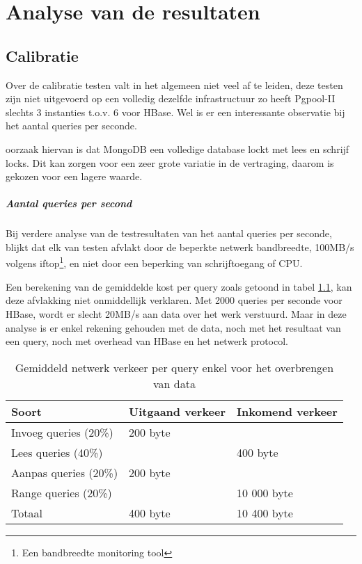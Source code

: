 \chapter{Analyse van de resultaten}

\section{Calibratie}
Over de calibratie testen valt in het algemeen niet veel af te leiden, deze testen zijn niet uitgevoerd op een volledig dezelfde infrastructuur zo heeft Pgpool-II slechts 3 instanties t.o.v. 6 voor HBase. Wel is er een interessante observatie bij het aantal queries per seconde.  

oorzaak hiervan is dat MongoDB een volledige database lockt met lees en schrijf locks. Dit kan zorgen voor een zeer grote variatie in de vertraging, daarom is gekozen voor een lagere waarde.  

\paragraph{Aantal queries per second} Bij verdere analyse van de testresultaten van het aantal queries per seconde, blijkt dat elk van testen afvlakt door de beperkte netwerk bandbreedte, 100MB/s volgens iftop\footnote{Een bandbreedte monitoring tool}, en niet door een beperking van schrijftoegang of CPU. 

Een berekening van de gemiddelde kost per query zoals getoond in tabel \ref{table:calibratie-analyse-netwerk}, kan deze afvlakking niet onmiddellijk verklaren. Met 2000 queries per seconde voor HBase, wordt er slecht 20MB/s aan data over het werk verstuurd. Maar in deze analyse is er enkel rekening gehouden met de data, noch met het resultaat van een query, noch met overhead van HBase en het netwerk protocol. 


\begin{table}[h!]
\centering
\begin{tabular}{l|l l}
	\textbf{Soort}  & \textbf{Uitgaand verkeer} & \textbf{Inkomend verkeer} \\ \hline
	Invoeg queries (20\%) & 200 byte  & \\
	Lees queries (40\%) & & 400 byte\\
	Aanpas queries (20\%) & 200 byte & \\
	Range queries (20\%) & & 10 000 byte\\ \hline
	Totaal & 400 byte & 10 400 byte \\
\end{tabular}
\caption{Gemiddeld netwerk verkeer per query enkel voor het overbrengen van data}\label{table:calibratie-analyse-netwerk}
\end{table}

